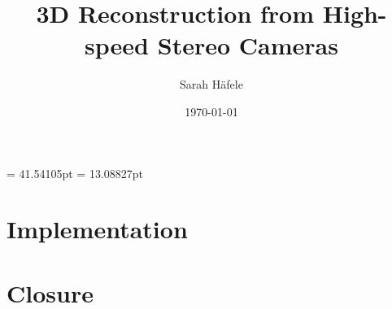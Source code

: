 

\evensidemargin = 41.54105pt
\oddsidemargin  = 13.08827pt


\presentdate{\today}						%
{}				%

\author{Sarah Häfele}
\title{3D Reconstruction from High-speed Stereo Cameras}
\subject{Master-Thesis}
\publishers{Hochschule Furtwangen\\Fakultät Digitale Medien}
\date{\today}



\frontmatter
\maketitle					%
\clearpage
\clearpage
\tableofcontents			%

\mainmatter

\chapter{Implementation}\label{c:Implementation}	%




\chapter{Closure} 			%



\appendix
\printindex					%
\listoffigures				%
	
	
